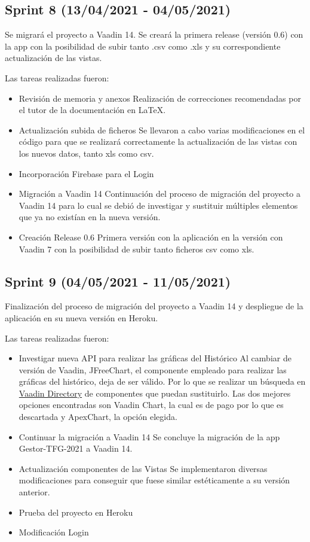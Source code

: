 \begin{itemize}
\end{itemize}

\subsection{Sprint 8 (13/04/2021 - 04/05/2021)}
Se migrará el proyecto a Vaadin 14. Se creará la primera release (versión 0.6) con la app con la posibilidad de subir tanto .csv como .xls y su correspondiente actualización de las vistas.

Las tareas realizadas fueron:
\begin{itemize}
	\tightlist
	\item Revisión de memoria y anexos
	Realización de correcciones recomendadas por el tutor de la documentación en LaTeX.
	\item Actualización subida de ficheros
	Se llevaron a cabo varias modificaciones en el código para que se realizará correctamente la actualización de las vistas con los nuevos datos, tanto xls como csv.
	\item Incorporación Firebase para el Login 
	\item Migración a Vaadin 14
	Continuación del proceso de migración del proyecto a Vaadin 14 para lo cual se debió de investigar y sustituir múltiples elementos que ya no existían en la nueva versión.
	\item Creación Release 0.6 
	Primera versión con la aplicación en la versión con Vaadin 7 con la posibilidad de subir tanto ficheros csv como xls. 
	
\end{itemize}

\subsection{Sprint 9 (04/05/2021 - 11/05/2021)}
Finalización del proceso de migración del proyecto a Vaadin 14 y despliegue de la aplicación en su nueva versión en Heroku.

Las tareas realizadas fueron:
\begin{itemize}
	\tightlist
	\item Investigar nueva API para realizar las gráficas del Histórico
	Al cambiar de versión de Vaadin, JFreeChart, el componente empleado para realizar las gráficas del histórico, deja de ser válido. Por lo que se realizar un búsqueda en \href{https://vaadin.com/directory}{Vaadin Directory} de componentes que puedan sustituirlo. Las dos mejores opciones encontradas son Vaadin Chart, la cual es de pago por lo que es descartada y ApexChart, la opción elegida.
	\item Continuar la migración a Vaadin 14
	Se concluye la migración de la app Gestor-TFG-2021 a Vaadin 14.
	\item Actualización componentes de las Vistas
	Se implementaron diversas modificaciones para conseguir que fuese similar estéticamente a su versión anterior.
	\item Prueba del proyecto en Heroku
	\item Modificación Login
	
\end{itemize}

